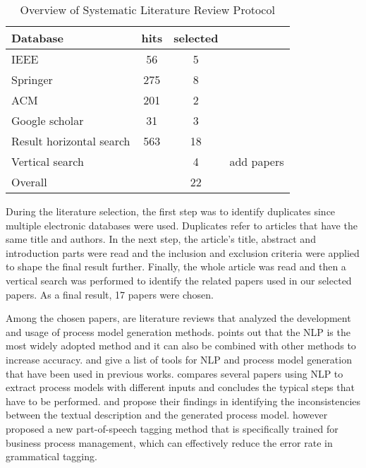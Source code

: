 		\begin{table}[]
		\begin{center}
		\caption{\centering Overview of Systematic Literature Review Protocol}
		\begin{tabular}{lccl}
    	\textbf{Database}\hspace{30mm} & \textbf{hits} & \textbf{selected} &  \\
    	\hline
		IEEE                     		& 56   & 5   &      		\\
		Springer                 		& 275  & 8   &      		\\
		ACM                      		& 201  & 2   &      		\\
		Google scholar           		& 31   & 3   &      		\\
		\hline
		Result horizontal search	 	& 563  & 18  &      		\\
		Vertical search          		&      & 4   &  \hspace{5mm}add papers  \\
		\hline
		Overall                  		&      & 22   &     
		\end{tabular}
		\end{center}
	\end{table}
	
	During the literature selection, the first step was to identify duplicates since multiple electronic databases were used. Duplicates refer to articles that have the same title and authors. In the next step, the article's title, abstract and introduction parts were read and the inclusion and exclusion criteria were applied to shape the final result further. Finally, the whole article was read and then a vertical search was performed to identify the related papers used in our selected papers. As a final result, 17 papers were chosen. 
	
	Among the chosen papers, \cite{literature_review_1} \cite{literature_review_2} \cite{literature_review_3} \cite{literature_review_4} are literature reviews that analyzed the development and usage of process model generation methods. \cite{literature_review_3} points out that the NLP is the most widely adopted method and it can also be combined with other methods to increase accuracy. \cite{literature_review_1} and \cite{literature_review_3} give a list of tools for NLP and process model generation that have been used in previous works. \cite{literature_review_4} compares several papers using NLP to extract process models with different inputs and concludes the typical steps that have to be performed. \cite{complement_2} and \cite{complement_3} propose their findings in identifying the inconsistencies between the textual description and the generated process model. \cite{complement_4} however proposed a new part-of-speech tagging method that is specifically trained for business process management, which can effectively reduce the error rate in grammatical tagging.
	
